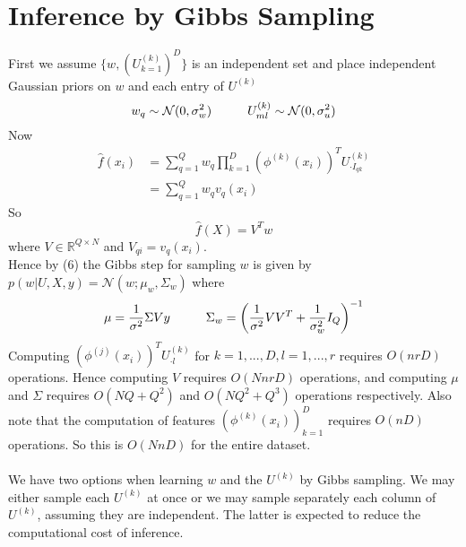 \documentclass[a4paper,10pt]{article}
\begin{document}
\section{Inference by Gibbs Sampling}
First we assume $\{w,(U^{(k)}_{k=1})^D\}$ is an independent set and place independent Gaussian priors on $w$ and each entry of $U^{(k)}$
\begin{equation}
w_q \sim \mathcal{N}(0,\sigma_w^2) \hspace{10 mm} U^{(k)}_{ml} \sim \mathcal{N}(0,\sigma_u^2)
\end{equation}
Now 
\begin{equation}
\begin{split}
\hat{f}(x_i)
& =\sum_{q=1}^Q w_q \prod_{k=1}^D (\phi^{(k)}(x_i))^T U^{(k)}_{\cdot I_{qk}} \\
& =\sum_{q=1}^Q w_q v_q(x_i)
\end{split}
\end{equation}
So 
\begin{equation}
\hat{f}(X)=V^T w 
\end{equation}
where $V \in \mathbb{R}^{Q \times N}$ and $V_{qi}=v_q(x_i)$. \\
Hence by (6) the Gibbs step for sampling $w$ is given by $p(w|U,X,y)=\mathcal{N}(w;\mu_w,\Sigma_w)$ where
\begin{equation}
\mu=\frac{1}{\sigma^2}\Sigma V y  \hspace{10 mm} \Sigma_w = \bigg( \frac{1}{\sigma^2}V V^T + \frac{1}{\sigma_w^2}I_Q \bigg) ^{-1}
\end{equation}
Computing $(\phi^{(j)}(x_i))^T U^{(k)}_{\cdot l}$ for $k=1,...,D, l=1,...,r$ requires $O(nrD)$ operations. Hence computing $V$ requires $O(NnrD)$ operations, and computing $\mu$ and $\Sigma$ requires $O(NQ+Q^2)$ and $O(NQ^2+Q^3)$ operations respectively. Also note that the computation of features $(\phi^{(k)}(x_i))_{k=1}^D $ requires $O(nD)$ operations. So this is $O(NnD)$ for the entire dataset.
\\
\\
We have two options when learning $w$ and the $U^{(k)}$ by Gibbs sampling. We may either sample each $U^{(k)}$ at once or we may sample separately each column of $U^{(k)}$, assuming they are independent. The latter is expected to reduce the computational cost of inference.
\end{document}
